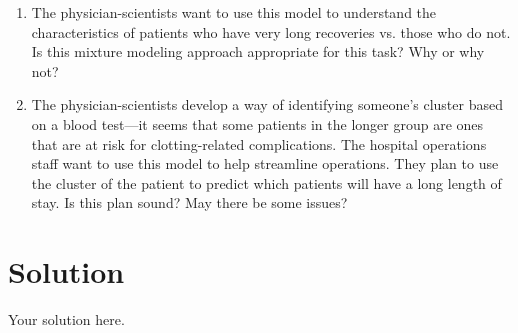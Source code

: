 \documentclass[submit]{../harvardml}
\newenvironment{solution}
  {\color{blue}\section*{Solution}}
{}
\begin{document}
\begin{problem}
\begin{enumerate}
    \item The physician-scientists want to use this model to understand
    the characteristics of patients who have very long recoveries
    vs. those who do not.  Is this mixture modeling approach appropriate
    for this task?  Why or why not?

    \item The physician-scientists develop a way of identifying someone's
    cluster based on a blood test---it seems that some patients in the
    longer group are ones that are at risk for clotting-related
    complications.  The hospital operations staff want to use this model
    to help streamline operations.  They plan to use the cluster of the
    patient to predict which patients will have a long length of stay.
    Is this plan sound?  May there be some issues?
  \end{enumerate} 
\end{problem} 

\begin{solution}
	Your solution here.
\end{solution}

\newpage
\end{document}
